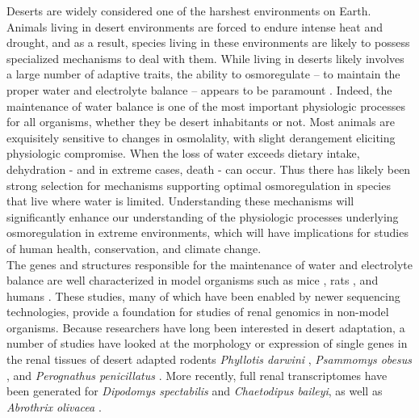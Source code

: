 \documentclass[12pt]{article}
\begin{document}
Deserts are widely considered one of the harshest environments on Earth. Animals living in desert environments are forced to endure intense heat and drought, and as a result, species living in these environments are likely to possess specialized mechanisms to deal with them. While living in deserts likely involves a large number of adaptive traits, the ability to osmoregulate -- to maintain the proper water and electrolyte balance -- appears to be paramount \citep{Walsberg:2000uu}. Indeed, the maintenance of water balance is one of the most important physiologic processes for all organisms, whether they be desert inhabitants or not. Most animals are exquisitely sensitive to changes in osmolality, with slight derangement eliciting physiologic compromise.  When the loss of water exceeds dietary intake, dehydration - and in extreme cases, death - can occur. Thus there has likely been strong selection for mechanisms supporting optimal osmoregulation in species that live where water is limited. Understanding these mechanisms will significantly enhance our understanding of the physiologic processes underlying osmoregulation in extreme environments, which will have implications for studies of human health, conservation, and climate change. \\

The genes and structures responsible for the maintenance of water and electrolyte balance are well characterized in model organisms such as mice \citep{Tatum:2009kp}, rats \citep{Romero:2007fs,Rojek:2006dg,NIELSEN:1995uq}, and humans \citep{Mobasheri:2007tt,Bedford:2003wa,NIELSEN:1999vg}. These studies, many of which have been enabled by newer sequencing technologies, provide a foundation for studies of renal genomics in non-model organisms. Because researchers have long been interested in desert adaptation, a number of studies have looked at the morphology or expression of single genes in the renal tissues of desert adapted rodents \textit{Phyllotis darwini} \citep{Gallardo:2005fm}, \textit{Psammomys obesus} \citep{Kaissling:1975uu}, and \textit{Perognathus penicillatus} \citep{Altschuler:1979du}. More recently, full renal transcriptomes have been generated for \textit{Dipodomys spectabilis} and \textit{Chaetodipus baileyi}, \citep{Marra:2014de} as well as \textit{Abrothrix olivacea} \citep{Giorello:2014iv}. \\
\end{document}
